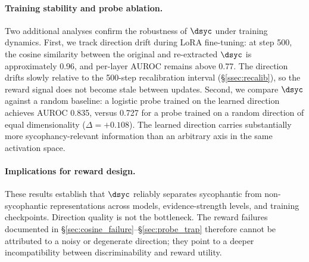 \paragraph{Training stability and probe ablation.}
Two additional analyses confirm the robustness of $\dsyc$ under training dynamics.
First, we track direction drift during LoRA fine-tuning: at step 500, the cosine similarity between the original and re-extracted $\dsyc$ is approximately 0.96, and per-layer AUROC remains above 0.77.
The direction drifts slowly relative to the 500-step recalibration interval (\S\ref{ssec:recalib}), so the reward signal does not become stale between updates.
Second, we compare $\dsyc$ against a random baseline: a logistic probe trained on the learned direction achieves AUROC 0.835, versus 0.727 for a probe trained on a random direction of equal dimensionality ($\Delta{=}{+}0.108$).
The learned direction carries substantially more sycophancy-relevant information than an arbitrary axis in the same activation space.

\paragraph{Implications for reward design.}
These results establish that $\dsyc$ reliably separates sycophantic from non-sycophantic representations across models, evidence-strength levels, and training checkpoints.
Direction quality is not the bottleneck.
The reward failures documented in \S\ref{sec:cosine_failure}--\S\ref{sec:probe_trap} therefore cannot be attributed to a noisy or degenerate direction; they point to a deeper incompatibility between discriminability and reward utility.
